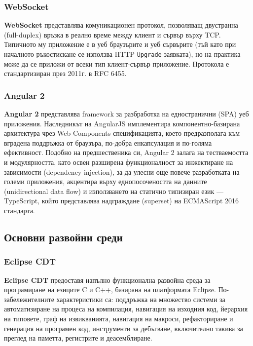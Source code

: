 \documentclass[12pt,a4paper,oneside]{book}
\begin{document}
\subsubsection{WebSocket}

\textbf{WebSocket} представлява комуникационен протокол, позволяващ двустранна
(full-duplex) връзка в реално време между клиент и сървър върху TCP. Типичното му
приложение е в уеб браузърите и уеб сървърите (тъй като при началното ръкостискане се използва
HTTP \texttt{Upgrade} заявката), но на практика може да се приложи от всеки тип
клиент-сървър приложение. Протокола е стандартизиран през 2011г. в RFC 6455.

\subsubsection{Angular 2}

\textbf{Angular 2} представлява framework за разбработка на едностранични
(SPA) уеб приложения. Наследникът на AngularJS имплементира компонентно-базирана
архитектура чрез Web Components спецификацията, което предразполага към вградена
поддръжка от браузъра, по-добра енкапсулация и по-голяма ефективност. Подобно на
предшественика си, Angular 2 залага на тестваемостта и модулярността, като освен
разширена функционалност за инжектиране на зависимости (dependency injection),
за да улесни още повече разработката на големи приложения,
акцентира върху еднопосочеността на данните (unidirectional data flow) и
използването на статично типизиран език --- TypeScript, който представлява
надграждане (superset) на ECMAScript 2016 стандарта.

\subsection{Основни развойни среди}

\subsubsection{Eclipse CDT}

\textbf{Eclipse CDT} предоставя напълно функционална развойна среда за програмиране на
езиците C и C++, базирана на платформата Eclipse. По-забележителните
характеристики са: поддръжка на множество системи за автоматизиране на процеса
на компилация, навигация на изходния код, йерархия на типовете, граф на
извикванията, навигация на макроси, рефакториране и генерация на програмен код,
инструменти за дебъгване, включително такива за преглед на паметта, регистрите и
деасемблиране.
\end{document}
